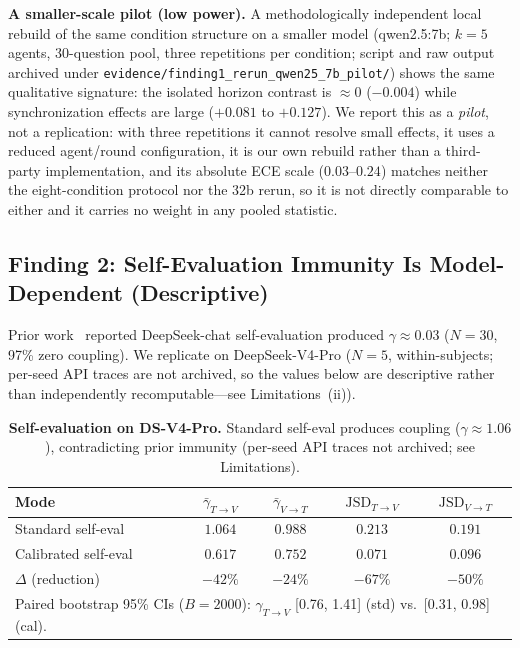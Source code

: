 \documentclass[11pt]{article}
\theoremstyle{definition}
\theoremstyle{remark}
\begin{document}
\textbf{A smaller-scale pilot (low power).} A methodologically independent local rebuild of the same condition structure on a smaller model (qwen2.5:7b; $k{=}5$ agents, 30-question pool, three repetitions per condition; script and raw output archived under \texttt{evidence/finding1\_rerun\_qwen25\_7b\_pilot/}) shows the same qualitative signature: the isolated horizon contrast is $\approx 0$ ($-0.004$) while synchronization effects are large ($+0.081$ to $+0.127$). We report this as a \emph{pilot}, not a replication: with three repetitions it cannot resolve small effects, it uses a reduced agent/round configuration, it is our own rebuild rather than a third-party implementation, and its absolute ECE scale ($0.03$--$0.24$) matches neither the eight-condition protocol nor the 32b rerun, so it is not directly comparable to either and it carries no weight in any pooled statistic.
\subsection{Finding 2: Self-Evaluation Immunity Is Model-Dependent (Descriptive)}

Prior work~\citep{epc2026} reported DeepSeek-chat self-evaluation produced $\gamma \approx 0.03$ ($N{=}30$, 97\% zero coupling). We replicate on DeepSeek-V4-Pro ($N{=}5$, within-subjects; per-seed API traces are not archived, so the values below are descriptive rather than independently recomputable---see Limitations~(ii)).

\begin{table}[H]
\centering
\caption{\textbf{Self-evaluation on DS-V4-Pro.} Standard self-eval produces coupling ($\gamma \approx 1.06$), contradicting prior immunity (per-seed API traces not archived; see Limitations).}
\begin{tabular}{@{}lcccc@{}}
\toprule
Mode & $\bar{\gamma}_{T \to V}$ & $\bar{\gamma}_{V \to T}$ & $\text{JSD}_{T \to V}$ & $\text{JSD}_{V \to T}$ \\
\midrule
Standard self-eval & $1.064$ & $0.988$ & $0.213$ & $0.191$ \\
Calibrated self-eval & $\mathbf{0.617}$ & $\mathbf{0.752}$ & $\mathbf{0.071}$ & $\mathbf{0.096}$ \\
\midrule
$\Delta$ (reduction) & $-42\%$ & $-24\%$ & $-67\%$ & $-50\%$ \\
\bottomrule
\multicolumn{5}{l}{\footnotesize Paired bootstrap 95\% CIs ($B{=}2000$): $\gamma_{T\to V}$ [0.76, 1.41] (std) vs.\ [0.31, 0.98] (cal).} \\
\end{tabular}
\end{table}
\end{document}
